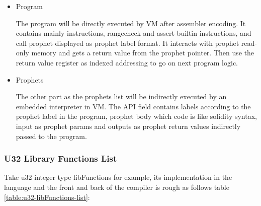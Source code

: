 \begin{itemize}
    \item Program

The program will be directly executed by VM after assembler encoding. It contains mainly instructions, rangecheck and assert builtin instructions,
and call prophet displayed as prophet label format. It interacts with prophet read-only memory and gets a return value from the prophet pointer.
Then use the return value register as indexed addressing to go on next program logic.
    \item Prophets

The other part as the prophets list will be indirectly executed by an embedded interpreter in VM.
The API field contains labels according to the prophet label in the program, prophet body which code is like solidity syntax,
input as prophet params and outputs as prophet return values indirectly passed to the program.
\end{itemize}

\subsubsection{U32 Library Functions List}
    Take u32 integer type libFunctions for example, its implementation in the language and the front and back of the compiler is rough as follows table \ref{table:u32-libFunctions-list}:

